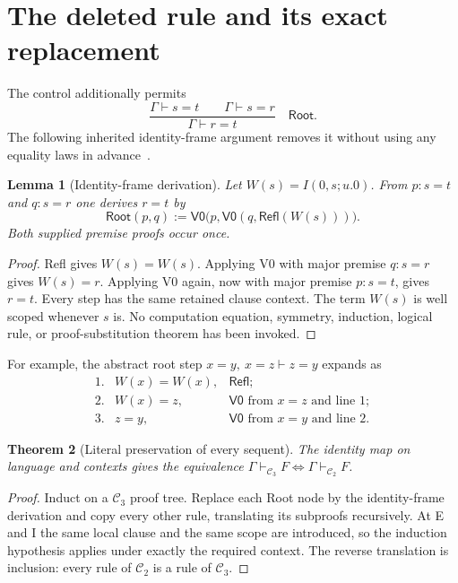 \documentclass[11pt,letterpaper]{article}
\newtheorem{theorem}{Theorem}[section]
\newtheorem{lemma}[theorem]{Lemma}
\theoremstyle{definition}
\newcommand{\Cred}{\mathcal C_2}
\newcommand{\Cold}{\mathcal C_3}
\newcommand{\Refl}{\mathsf{Refl}}
\newcommand{\Root}{\mathsf{Root}}
\newcommand{\VZ}{\mathsf{V0}}
\begin{document}
\section{The deleted rule and its exact replacement}
\label{sec:frame}

The control additionally permits
\[
 \frac{\Gamma\vdash s=t\qquad\Gamma\vdash s=r}
      {\Gamma\vdash r=t}\quad\Root.
 \tag{Root}\label{rule:root}
\]
The following inherited identity-frame argument removes it without
using any equality laws in advance~\cite{identity}.

\begin{lemma}[Identity-frame derivation]
Let $W(s)=I(0,s;u.0)$. From $p:s=t$ and $q:s=r$ one derives
$r=t$ by
\[
 \boxed{\quad
   \Root(p,q):=\VZ\bigl(p,\VZ(q,\Refl(W(s)))\bigr).
 \quad}
\]
Both supplied premise proofs occur once.
\end{lemma}
\begin{proof}
Refl gives $W(s)=W(s)$. Applying V0 with major premise $q:s=r$
gives $W(s)=r$. Applying V0 again, now with major premise $p:s=t$,
gives $r=t$. Every step has the same retained clause context. The
term $W(s)$ is well scoped whenever $s$ is. No computation equation,
symmetry, induction, logical rule, or proof-substitution theorem has
been invoked.
\end{proof}

For example, the abstract root step $x=y,\ x=z\vdash z=y$ expands as
\[
 \begin{array}{rll}
 1.&W(x)=W(x),&\Refl;\\
 2.&W(x)=z,&\VZ\text{ from }x=z\text{ and line 1};\\
 3.&z=y,&\VZ\text{ from }x=y\text{ and line 2}.
 \end{array}
\]

\begin{theorem}[Literal preservation of every sequent]
The identity map on language and contexts gives the equivalence
$\Gamma\vdash_{\Cold}F\iff\Gamma\vdash_{\Cred}F$.
\end{theorem}
\begin{proof}
Induct on a $\Cold$ proof tree. Replace each Root node by the
identity-frame derivation and copy every other rule, translating
its subproofs recursively. At E and I the same local clause and
the same scope are introduced, so the induction hypothesis applies
under exactly the required context. The reverse translation is
inclusion: every rule of $\Cred$ is a rule of $\Cold$.
\end{proof}
\end{document}
